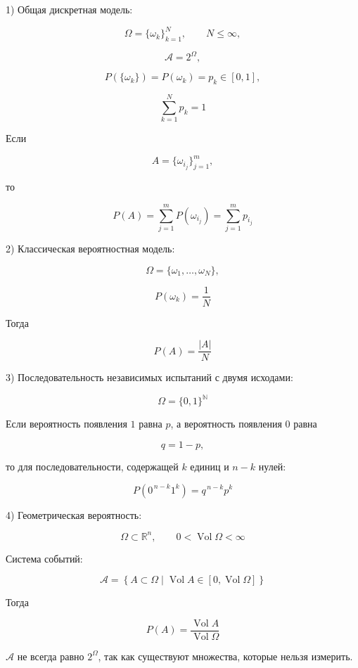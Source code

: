 \documentclass[12pt,a4paper]{article}
\begin{document}
\begin{example}

1) Общая дискретная модель:

\[
\Omega=\{\omega_k\}_{k=1}^{N},
\qquad N\leq\infty,
\]

\[
\mathcal{A}=2^\Omega,
\]

\[
P(\{\omega_k\})
=
P(\omega_k)
=
p_k\in[0,1],
\]

\[
\sum_{k=1}^{N}p_k=1
\]

Если

\[
A=\{\omega_{i_j}\}_{j=1}^{m},
\]

то

\[
P(A)
=
\sum_{j=1}^{m}P(\omega_{i_j})
=
\sum_{j=1}^{m}p_{i_j}
\]


\medskip

2) Классическая вероятностная модель:

\[
\Omega=\{\omega_1,\ldots,\omega_N\},
\]

\[
P(\omega_k)=\frac1N
\]

Тогда

\[
P(A)=\frac{|A|}{N}
\]


\medskip

3) Последовательность независимых испытаний с двумя исходами:

\[
\Omega=\{0,1\}^{\mathbb{N}}
\]

Если вероятность появления $1$ равна $p$, а вероятность появления $0$ равна

\[
q=1-p,
\]

то для последовательности, содержащей $k$ единиц и $n-k$ нулей:

\[
P(0^{\,n-k}1^k)
=
q^{\,n-k}p^k
\]


\medskip

4) Геометрическая вероятность:

\[
\Omega\subset\mathbb{R}^n,
\qquad
0<\operatorname{Vol}\Omega<\infty
\]

Система событий:

\[
\mathcal{A}
=
\left\{
A\subset\Omega
\mid
\operatorname{Vol}A\in
[0,\operatorname{Vol}\Omega]
\right\}
\]

Тогда

\[
P(A)
=
\frac{\operatorname{Vol}A}
{\operatorname{Vol}\Omega}
\]


\begin{note}
$\mathcal{A}$ не всегда равно $2^\Omega$, так как существуют множества, которые нельзя измерить.
\end{note}

\end{example}
\end{document}
